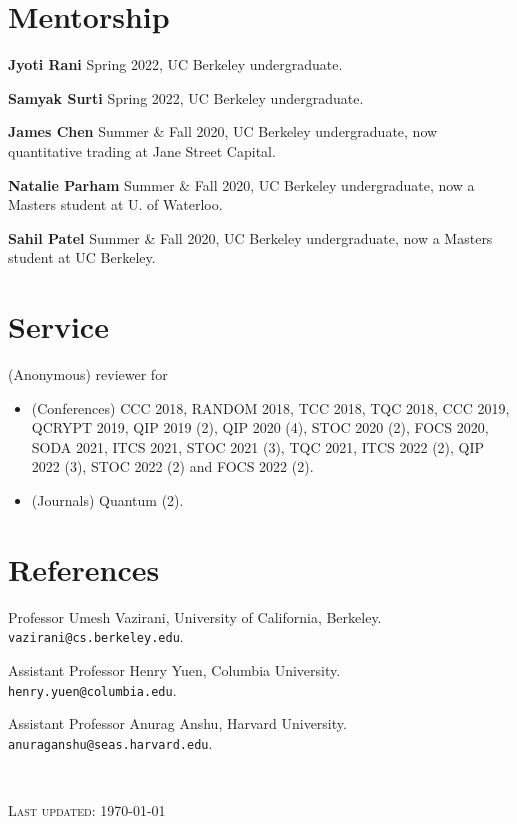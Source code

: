 \documentclass{article}
\begin{document}

\section{Mentorship}
\textbf{Jyoti Rani}
Spring 2022, 
UC Berkeley undergraduate.

\textbf{Samyak Surti}
Spring 2022,
UC Berkeley undergraduate.

\textbf{James Chen}
Summer \& Fall 2020,
UC Berkeley undergraduate, now quantitative trading at Jane Street Capital.

\textbf{Natalie Parham}
Summer \& Fall 2020,
UC Berkeley undergraduate, now a Masters student at U. of Waterloo.

\textbf{Sahil Patel} 
Summer \& Fall 2020,
UC Berkeley undergraduate, now a Masters student at UC Berkeley.

\section{Service}
(Anonymous) reviewer for 
\begin{itemize}
\item (Conferences) CCC 2018, RANDOM 2018, TCC 2018, TQC 2018, CCC 2019, QCRYPT 2019, QIP 2019 (2), QIP 2020 (4), STOC 2020 (2), FOCS 2020, SODA 2021, ITCS 2021, STOC 2021 (3), TQC 2021, ITCS 2022 (2), QIP 2022 (3), STOC 2022 (2) and FOCS 2022 (2).
\item (Journals) Quantum (2).
\end{itemize}


\section{References}
Professor Umesh Vazirani, University of California, Berkeley. \texttt{vazirani@cs.berkeley.edu}.

Assistant Professor Henry Yuen, Columbia University. \texttt{henry.yuen@columbia.edu}.

Assistant Professor Anurag Anshu, Harvard University. \texttt{anuraganshu@seas.harvard.edu}.
\

\

\textsc{Last updated: \today}
\end{document}
